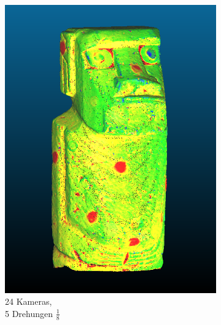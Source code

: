 \documentclass[./00PhotoBox.tex]{subfiles}
\begin{document}
\begin{figure}
\begin{subfigure}{0.24\textwidth}
        \includegraphics[width=1\linewidth]{img/cam_anzahl/allCamerasWithMask.png}
        \centering
        \caption{24 Kameras,\\5 Drehungen $\frac{1}{8}$} %
        \label{img:moai_grobschritt} %
    \end{subfigure}
    \begin{subfigure}{0.24\textwidth}

\end{subfigure}
\end{figure}
\end{document}
